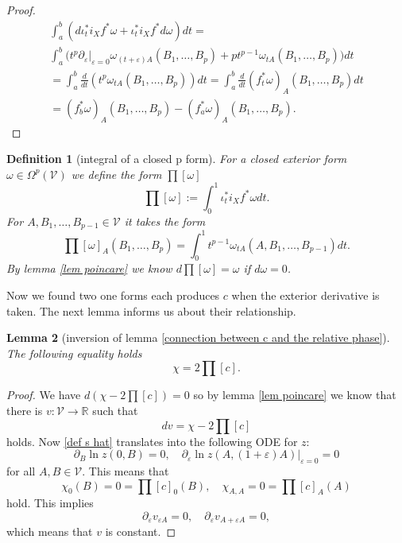 \documentclass[b5paper,draft,openbib,12pt]{memoir}
\newtheorem{Def}{Definition}
\newtheorem{Lemma}[Def]{Lemma}
\begin{document}
\begin{proof}
\begin{align}
\int_a^b (d\iota_t^* i_X f^* \omega+ \iota_t^* i_X f^* d \omega )dt=\\
\int_a^b  \Big( t^p\partial_{\varepsilon}|_{\varepsilon=0} \omega_{(t+\varepsilon)A}(B_1,\dots, B_p)
+p t^{p-1}\omega_{tA}(B_1,\dots, B_p)\Big) dt\\
=\int_a^b  \frac{d}{dt} (t^p \omega_{tA}(B_1,\dots, B_p))dt =\int_a^b  \frac{d}{dt} (f^*_t \omega)_{A}(B_1,\dots, B_p)dt\\
=(f^*_b\omega)_A(B_1,\dots,B_p)-(f^*_a\omega)_A(B_1,\dots,B_p).
\end{align}

\end{proof}

\begin{Def}[integral of a closed p form]
For a closed exterior form \(\omega\in\Omega^{p}(\mathcal{V})\) we define the form \(\prod [\omega]\)
\begin{equation}
\prod\![\omega]:=\int_{0}^1 \iota^*_t i_X f^* \omega dt.
\end{equation}
For \(A,B_1,\dots , B_{p-1}\in\mathcal{V}\) it takes the form 
\begin{equation}
\prod\![\omega]_A(B_1,\dots, B_p)=\int_0^1 t^{p-1} \omega_{tA}(A,B_1,\dots, B_{p-1})dt.
\end{equation}
By lemma \ref{lem poincare} we know \(d\prod [\omega]=\omega\) if \(d\omega=0\).
\end{Def}

Now we found two one forms each produces \(c\) when the exterior derivative is taken. The next lemma informs us about their relationship.

\begin{Lemma}[inversion of lemma \ref{connection between c and the relative phase}]
The following equality holds
\begin{equation}
\chi=2 \prod\![c].
\end{equation}
\end{Lemma}
\begin{proof}
We have \(d(\chi-2 \prod\![c])=0\) so by lemma \ref{lem poincare} we know that there is \(v:\mathcal{V}\rightarrow \mathbb{R}\) such that
\begin{equation}
dv=\chi-2 \prod\![c]
\end{equation}
holds. Now \eqref{def s hat} translates into the following ODE for \(z\):
\begin{equation}
\partial_B \ln z(0,B)=0, \quad \partial_\varepsilon \ln z(A,(1+\varepsilon)A)|_{\varepsilon =0}=0
\end{equation}
for all \(A,B\in\mathcal{V}\). This means that
\begin{equation}
\chi_0(B)=0=\prod\![c]_0(B), \quad \chi_{A,A}=0=\prod\![c]_A(A)
\end{equation}
hold. This implies
\begin{equation}
\partial_\varepsilon v_{\varepsilon A}=0, \quad \partial_\varepsilon v_{A+\varepsilon A}=0,
\end{equation}
which means that \(v\) is constant.
\end{proof}
\end{document}
